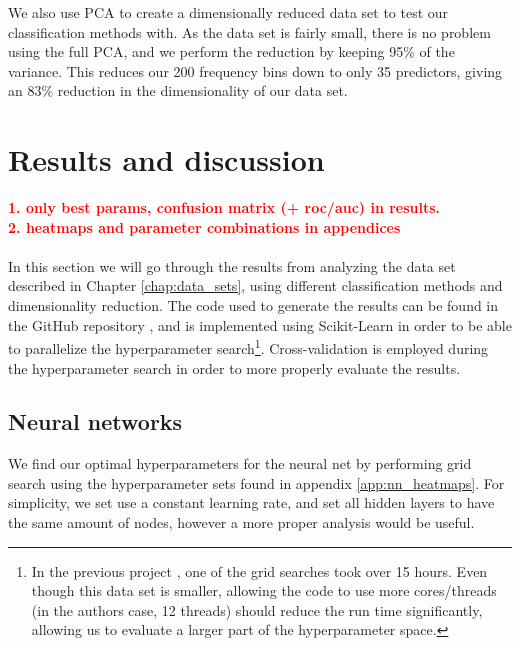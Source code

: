 \documentclass[a4paper]{article}
\newcommand\red[1]{\textcolor{red}{\textbf{#1}}}
\begin{document}
We also use PCA to create a dimensionally reduced data set to test our classification methods with.
As the data set is fairly small, there is no problem using the full PCA, and we perform the reduction by keeping 95\% of the variance. This reduces our 200 frequency bins down to only 35 predictors, giving an 83\% reduction in the dimensionality of our data set.

\section{Results and discussion} \label{chap:results}
\red{1. only best params, confusion matrix (+ roc/auc) in results. \\2. heatmaps and parameter combinations in appendices}
\\\\
In this section we will go through the results from analyzing the data set described in Chapter \ref{chap:data_sets}, using different classification methods and dimensionality reduction. The code used to generate the results can be found in the GitHub repository \cite{Github3}, and is implemented using Scikit-Learn \cite{scikit-learn} in order to be able to parallelize the hyperparameter search\footnote{In the previous project \cite{Github2}, one of the grid searches took over 15 hours. Even though this data set is smaller, allowing the code to use more cores/threads (in the authors case, 12 threads) should reduce the run time significantly, allowing us to evaluate a larger part of the hyperparameter space.}. Cross-validation is employed during the hyperparameter search in order to more properly evaluate the results.
\subsection{Neural networks}
We find our optimal hyperparameters for the neural net by performing grid search using the hyperparameter sets found in appendix \ref{app:nn_heatmaps}. For simplicity, we set use a constant learning rate, and set all hidden layers to have the same amount of nodes, however a more proper analysis would be useful.
\end{document}
